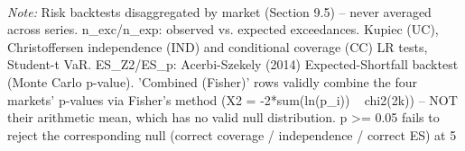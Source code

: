 \begin{table}[ht]
\\[3pt]\footnotesize\textit{Note:} Risk backtests disaggregated by market (Section 9.5) -- never averaged across series. n_exc/n_exp: observed vs. expected exceedances. Kupiec (UC), Christoffersen independence (IND) and conditional coverage (CC) LR tests, Student-t VaR. ES_Z2/ES_p: Acerbi-Szekely (2014) Expected-Shortfall backtest (Monte Carlo p-value). 'Combined (Fisher)' rows validly combine the four markets' p-values via Fisher's method (X2 = -2*sum(ln(p_i)) ~ chi2(2k)) -- NOT their arithmetic mean, which has no valid null distribution. p >= 0.05 fails to reject the corresponding null (correct coverage / independence / correct ES) at 5%
\end{table}